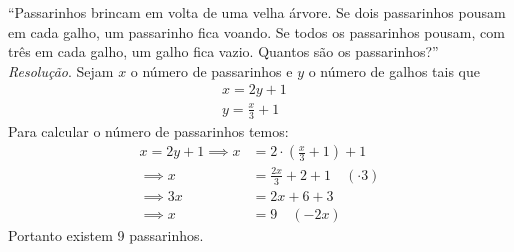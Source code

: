 \enquote{Passarinhos brincam em volta de uma velha árvore. Se dois passarinhos pousam em cada galho, um passarinho fica voando. Se todos os passarinhos pousam, com três em cada galho, um galho fica vazio. Quantos são os passarinhos?}
\\
\emph{Resolução}. Sejam $x$ o número de passarinhos e $y$ o número de galhos tais que
\begin{align*}
    x = 2y + 1 & \\
    y = \frac{x}{3} + 1 &
\end{align*}
Para calcular o número de passarinhos temos:
\begin{align*}
    x = 2y + 1 \implies x &= 2 \cdot (\frac{x}{3} + 1) + 1 \\
    \implies
    x &= \frac{2x}{3} + 2 + 1 \quad (\cdot 3) \\
    \implies
    3x &= 2x + 6 + 3 \\
    \implies
    x &= 9 \quad (-2x)
\end{align*}
Portanto existem 9 passarinhos.